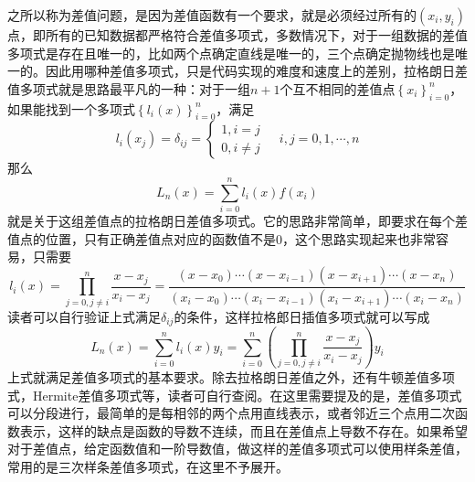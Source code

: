 \documentclass[12pt,a4paper,openany,twoside]{book}
\numberwithin{equation}{section}
\begin{document}
      之所以称为差值问题，是因为差值函数有一个要求，就是必须经过所有的$(x_i,y_i)$点，即所有的已知数据都严格符合差值多项式，多数情况下，对于一组数据的差值多项式是存在且唯一的，比如两个点确定直线是唯一的，三个点确定抛物线也是唯一的。因此用哪种差值多项式，只是代码实现的难度和速度上的差别，拉格朗日差值多项式就是思路最平凡的一种：对于一组$n+1$个互不相同的差值点$\left\{x_i\right\}_{i=0}^n$，如果能找到一个多项式$\left\{l_{i}(x)\right\}_{i=0}^{n}$，满足
      \begin{equation}
        l_{i}\left(x_{j}\right)=\delta_{i j}=\left\{\begin{array}{ll}{1, i=j}  \\ {0, i \neq j} \end{array}\right.\ \ \  \ \ i, j=0,1, \cdots, n
      \end{equation}
      那么
      \begin{equation}
        L_{n}(x)=\sum_{i=0}^{n} l_{i}(x) f\left(x_{i}\right)
      \end{equation}
      就是关于这组差值点的拉格朗日差值多项式。它的思路非常简单，即要求在每个差值点的位置，只有正确差值点对应的函数值不是0，这个思路实现起来也非常容易，只需要
      \begin{equation}
        l_{i}(x)=\prod_{j=0, j \neq i}^{n} \frac{x-x_{j}}{x_{i}-x_{j}}=\frac{\left(x-x_{0}\right) \cdots\left(x-x_{i-1}\right)\left(x-x_{i+1}\right) \cdots\left(x-x_{n}\right)}{\left(x_{i}-x_{0}\right) \cdots\left(x_{i}-x_{i-1}\right)\left(x_{i}-x_{i+1}\right) \cdots\left(x_{i}-x_{n}\right)}
      \end{equation}
      读者可以自行验证上式满足$\delta_{ij}$的条件，这样拉格郎日插值多项式就可以写成
      \begin{equation}
        L_{n}(x)=\sum_{i=0}^{n} l_{i}(x) y_i=\sum_{i=0}^{n}\left(\prod_{j=0, j \neq i}^{n} \frac{x-x_{j}}{x_{i}-x_{j}}\right) y_i
      \end{equation}
      上式就满足差值多项式的基本要求。除去拉格朗日差值之外，还有牛顿差值多项式，Hermite差值多项式等，读者可自行查阅。在这里需要提及的是，差值多项式可以分段进行，最简单的是每相邻的两个点用直线表示，或者邻近三个点用二次函数表示，这样的缺点是函数的导数不连续，而且在差值点上导数不存在。如果希望对于差值点，给定函数值和一阶导数值，做这样的差值多项式可以使用样条差值，常用的是三次样条差值多项式，在这里不予展开。
\end{document}

